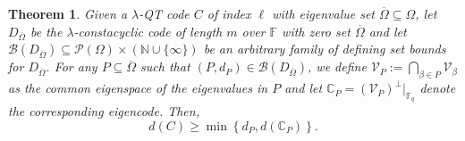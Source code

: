 \documentclass[11pt]{amsart}
\theoremstyle{plain}
\newtheorem{thm}{Theorem}[section]
\theoremstyle{definition}
\numberwithin{equation}{section}
\newcommand{\Fq}{\mathbb{F}_{q}}
\newcommand{\F}{{\mathbb F}}
\newcommand{\N}{\mathbb{N}}
\begin{document}
 
\begin{thm}\cite[Theorem 13]{ELLOT} \label{main thm new}
Given a $\lambda$-QT code $C$ of index $\ell$ with eigenvalue set $\overline{\Omega}\subseteq\Omega$, let $D_{\overline{\Omega}}$ be the $\lambda$-constacyclic code of length $m$ over $\F$ with zero set $\overline{\Omega}$ and let $\mathcal{B}(D_{\overline{\Omega}}) \subseteq \mathcal{P}(\Omega) \times (\N \cup \{\infty\})$ be an arbitrary family of defining set bounds for $D_{\overline{\Omega}}$. For any $P\subseteq \overline{\Omega}$ such that $(P,d_P)\in \mathcal{B}(D_{\overline{\Omega}})$, we define $\mathcal{V}_{P}:=\bigcap_{\beta\in P}\mathcal{V}_{\beta}$ as the common eigenspace of the eigenvalues in $P$ and let $\mathbb{C}_{P}=(\mathcal{V}_{P})^{\perp} \bigr\rvert_{\Fq}$ denote the corresponding eigencode. Then, 
\[
d(C) \geq \min \left\{ d_P, d(\mathbb{C}_P) \right\}.
\]
\end{thm}
\end{document}

